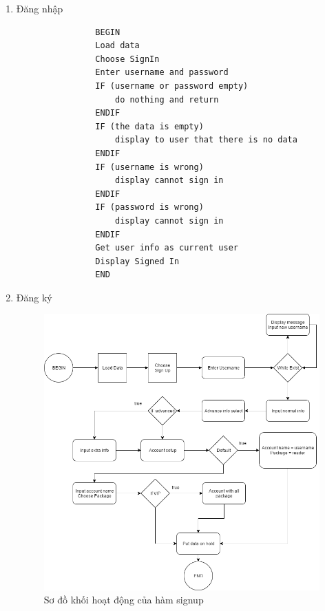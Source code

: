 \documentclass[12pt,a4paper]{report}
\begin{document}
           \begin{enumerate}
           \item Đăng nhập
                \begin{verbatim}
                BEGIN
                Load data
                Choose SignIn
                Enter username and password
                IF (username or password empty)
                    do nothing and return
                ENDIF
                IF (the data is empty)
                    display to user that there is no data
                ENDIF
                IF (username is wrong)
                    display cannot sign in
                ENDIF
                IF (password is wrong)
                    display cannot sign in
                ENDIF
                Get user info as current user
                Display Signed In
                END
                \end{verbatim}
                \newpage
                \item Đăng ký
                \begin{figure}[H]
                    \centering
                    \label{F:signup}
                    \includegraphics[scale = .5]{signup.png}
                    \caption{Sơ đồ khối hoạt động của hàm signup}


\end{figure}
\end{enumerate}
\end{document}
